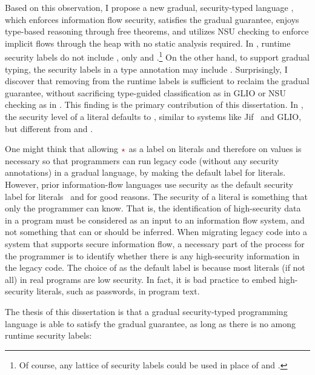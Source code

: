 Based on this observation, I propose a new gradual, security-typed language
\Surface, which  enforces information flow security, 
satisfies the gradual guarantee,  enjoys type-based reasoning through
free theorems, and  utilizes NSU checking to enforce implicit flows
through the heap with no static analysis required.
%
In \Surface, runtime security labels do not include \unk, only \low
and \high.\footnote{Of course, any lattice of security labels could be
used in place of \low and \high.}  On the other hand, to support
gradual typing, the security labels in a type annotation may
include \unk. Surprisingly, I discover that removing \unk from the
runtime labels is sufficient to reclaim the gradual guarantee, without
sacrificing type-guided classification as in GLIO or NSU checking as
in \WHILEG. This finding is the primary contribution of this dissertation.
%
In \Surface, the security level of a literal defaults to \low,
similar to systems like Jif~\parencite{Myers:2006aa} and GLIO, but
different from \GSLRef and \WHILEG.

One might think that allowing $\unk$ as a label on literals and therefore on
values is necessary so that programmers can run legacy code (without any
security annotations) in a gradual language, by making \unk the default label
for literals. However, prior information-flow languages use \low security as the
default security label for literals~\parencite{Myers:2006aa} and for good reasons.
The security of a literal is something that only the programmer can know. That
is, the identification of high-security data in a program must be considered as
an input to an information flow system, and not something that can or should be
inferred. When migrating legacy code into a system that supports secure
information flow, a necessary part of the process for the programmer is to
identify whether there is any high-security information in the legacy code. The
choice of \low as the default label is because most literals (if not all) in
real programs are low security. In fact, it is bad practice to embed
high-security literals, such as passwords, in program text.

The thesis of this dissertation is that a gradual security-typed programming
language is able to satisfy the gradual guarantee, as long as there is no \unk
among runtime security labels:

\vspace{20pt}

